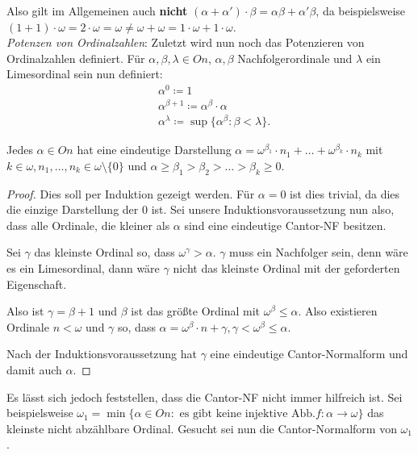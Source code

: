Also gilt im Allgemeinen auch \textbf{nicht} $(\alpha+\alpha')\cdot\beta=\alpha\beta+\alpha'\beta$, da beispielsweise $(1+1)\cdot\omega=2\cdot\omega=\omega \neq \omega+\omega = 1\cdot\omega+1\cdot\omega$.\\

\textit{Potenzen von Ordinalzahlen}: Zuletzt wird nun noch das Potenzieren von Ordinalzahlen definiert. Für $\alpha,\beta,\lambda\in On$, $\alpha, \beta$ Nachfolgerordinale und $\lambda$ ein Limesordinal sein nun definiert:
\begin{align*}
	&\alpha^0\coloneqq1\\
	&\alpha^{\beta+1}\coloneqq\alpha^\beta\cdot\alpha\\
	&\alpha^\lambda\coloneqq\sup\{\alpha^\beta:\beta<\lambda\}.
\end{align*}

\begin{satz}
	Jedes $\alpha\in On$ hat eine eindeutige Darstellung $\alpha=\omega^{\beta_1}\cdot n_1+\dots+\omega^{\beta_k}\cdot n_k$ mit $k\in\omega, n_1,\dots, n_k\in\omega\setminus\{0\}$ und $\alpha\geq\beta_1>\beta_2>\dots>\beta_k\geq0$.
\end{satz}
\begin{proof}
	Dies soll per Induktion gezeigt werden. Für $\alpha=0$ ist dies trivial, da dies die einzige Darstellung der $0$ ist. Sei unsere Induktionsvoraussetzung nun also, dass alle Ordinale, die kleiner als $\alpha$ sind eine eindeutige Cantor-NF besitzen.
	
	Sei $\gamma$ das kleinste Ordinal so, dass $\omega^\gamma>\alpha$. $\gamma$ muss ein Nachfolger sein, denn wäre es ein Limesordinal, dann wäre $\gamma$ nicht das kleinste Ordinal mit der geforderten Eigenschaft.
	
	Also ist $\gamma=\beta+1$ und $\beta$ ist das größte Ordinal mit $\omega^\beta \leq \alpha$. Also existieren Ordinale $n<\omega$ und $\gamma$ so, dass $\alpha=\omega^\beta\cdot n+\gamma, \gamma<\omega^\beta\leq\alpha$.
	
	Nach der Induktionsvoraussetzung hat $\gamma$ eine eindeutige Cantor-Normalform und damit auch $\alpha$.
\end{proof}

Es lässt sich jedoch feststellen, dass die Cantor-NF nicht immer hilfreich ist. Sei beispielsweise $\omega_1=\min\{\alpha\in On : \text{ es gibt keine injektive Abb.} f:\alpha\to\omega\}$ das kleinste nicht abzählbare Ordinal. Gesucht sei nun die Cantor-Normalform von $\omega_1$.

